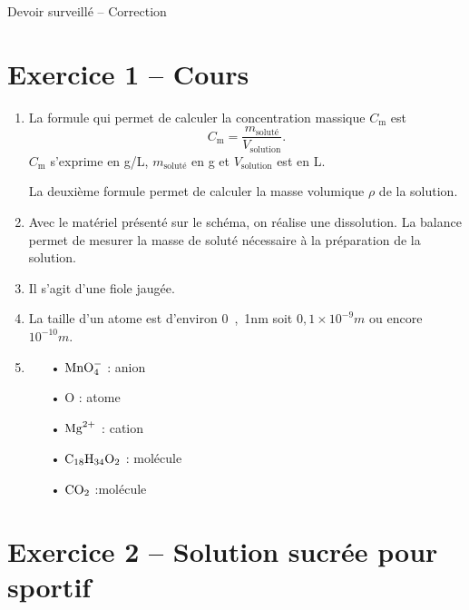 \documentclass[12pt,a4paper]{article}
\begin{document}
\begin{header}
Devoir surveillé -- Correction
\end{header}

\section*{Exercice 1 -- Cours}

\begin{enumerate}
\item
La formule qui permet de calculer la concentration massique $C_\mathrm{m}$ est 
\[
C_\mathrm{m} = \frac{m_\mathrm{soluté}}{V_\mathrm{solution}}.
\]
$C_\mathrm{m}$ s'exprime en g/L, $m_\mathrm{soluté}$ en g et $V_\mathrm{solution}$ est en L.

La deuxième formule permet de calculer la masse volumique $\rho$ de la solution.

\item 
Avec le matériel présenté sur le schéma, on réalise une dissolution.
La balance permet de mesurer la masse de soluté nécessaire à la préparation de la solution.

\item
Il s'agit d'une fiole jaugée.

\item 
La taille d'un atome est d'environ \unit{0{,}1}{nm} soit $\unit{0{,}1\times 10^{-9}}{m}$ ou encore $\unit{10^{-10}}{m}$.

\item
\begin{multicols}{3}
\begin{itemize}
\item[•] $\mathrm{MnO}_\mathrm{4}^\mathrm{-}$ : anion
\item[•] $\text{O}$ : atome
\item[•] $\mathrm{Mg}^\mathrm{2+}$ : cation
\item[•] $\mathrm{C}_\mathrm{18}\mathrm{H}_\mathrm{34}\mathrm{O}_\mathrm{2}$ : molécule
\item[•] $\mathrm{CO}_\mathrm{2}$ :molécule
\end{itemize}
\end{multicols}
\end{enumerate}

\section*{Exercice 2 -- Solution sucrée pour sportif}
\end{document}
